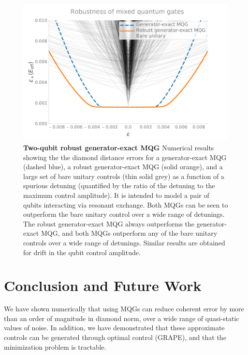 \documentclass[aps,nofootinbib,pra,notitlepage,twocolumn]{revtex4-1}
\newcommand{\0}{\ensuremath{\mathbf{0}}}
\begin{document}
{\begin{figure}
  \centering
  \includegraphics[width=\columnwidth]{figures/2q_robustness.pdf}
  \caption{\textbf{Two-qubit robust generator-exact MQG} Numerical results showing the the diamond distance errors for a generator-exact MQG (dashed blue), a robust generator-exact MQG (solid orange), and a large set of bare unitary controls (thin solid grey) as a function of a spurious detuning (quantified by the ratio of the detuning to the maximum control amplitude). It is intended to model a pair of qubits interacting via resonant exchange. Both MQGs can be seen to outperform the bare unitary control over a wide range of detunings. The robust generator-exact  MQG always outperforms the generator-exact MQG, and both MQGs outperform any of the bare unitary controls over a wide range of detunings. Similar results are obtained for drift in the qubit control amplitude.}
  \label{fig:2MQG}
\end{figure}








\section{Conclusion and Future Work}
We have shown numerically that using MQGs can reduce coherent error by more than an order of magnitude in diamond norm, over a wide range of quasi-static values of noise. In addition, we have demonstrated that these approximate controls can be generated through optimal control (GRAPE), and that the minimization problem is tractable.

}
\end{document}
